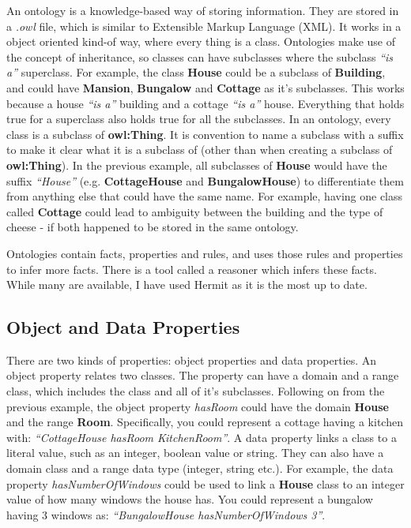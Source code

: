 An ontology is a knowledge-based way of storing information. They are stored in a \textit{.owl} file, which is similar to Extensible Markup Language (XML). It works in a object oriented kind-of way, where every thing is a class. Ontologies make use of the concept of inheritance, so classes can have subclasses where the subclass \textit{``is a''} superclass. For example, the class \textbf{House} could be a subclass of \textbf{Building}, and could have \textbf{Mansion}, \textbf{Bungalow} and \textbf{Cottage} as it's subclasses. This works because a house \textit{``is a''} building and a cottage \textit{``is a''} house. Everything that holds true for a superclass also holds true for all the subclasses. In an ontology, every class is a subclass of \textbf{owl:Thing}. It is convention to name a subclass with a suffix to make it clear what it is a subclass of (other than when creating a subclass of \textbf{owl:Thing}). In the previous example, all subclasses of \textbf{House} would have the suffix \textit{``House''} (e.g. \textbf{CottageHouse} and \textbf{BungalowHouse}) to differentiate them from anything else that could have the same name. For example, having one class called \textbf{Cottage} could lead to ambiguity between the building and the type of cheese - if both happened to be stored in the same ontology. 

Ontologies contain facts, properties and rules, and uses those rules and properties to infer more facts. There is a tool called a reasoner which infers these facts. While many are available, I have used Hermit \cite{hermit} as it is the most up to date.

\subsection{Object and Data Properties}

There are two kinds of properties: object properties and data properties. An object property relates two classes. The property can have a domain and a range class, which includes the class and all of it's subclasses. Following on from the previous example, the object property \textit{hasRoom} could have the domain \textbf{House} and the range \textbf{Room}. Specifically, you could represent a cottage having a kitchen with: \textit{``CottageHouse hasRoom KitchenRoom''}. A data property links a class to a literal value, such as an integer, boolean value or string. They can also have a domain class and a range data type (integer, string etc.). For example, the data property \textit{hasNumberOfWindows} could be used to link a \textbf{House} class to an integer value of how many windows the house has. You could represent a bungalow having 3 windows as: \textit{``BungalowHouse hasNumberOfWindows 3''}. 

